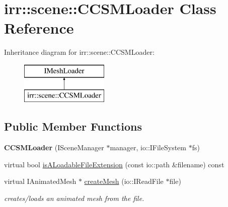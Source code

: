 \hypertarget{classirr_1_1scene_1_1_c_c_s_m_loader}{\section{irr\-:\-:scene\-:\-:C\-C\-S\-M\-Loader Class Reference}
\label{classirr_1_1scene_1_1_c_c_s_m_loader}
}
Inheritance diagram for irr\-:\-:scene\-:\-:C\-C\-S\-M\-Loader\-:\begin{figure}[H]
\begin{center}
\leavevmode
\includegraphics[height=2.000000cm]{classirr_1_1scene_1_1_c_c_s_m_loader}
\end{center}
\end{figure}
\subsection*{Public Member Functions}
\begin{DoxyCompactItemize}
\item 
\hypertarget{classirr_1_1scene_1_1_c_c_s_m_loader_a2a81fbd7c99a2c6f3edd713761928688}{{\bfseries C\-C\-S\-M\-Loader} (I\-Scene\-Manager $\ast$manager, io\-::\-I\-File\-System $\ast$fs)}\label{classirr_1_1scene_1_1_c_c_s_m_loader_a2a81fbd7c99a2c6f3edd713761928688}

\item 
virtual bool \hyperlink{classirr_1_1scene_1_1_c_c_s_m_loader_ad023927857b5a79a84b98225094b4f82}{is\-A\-Loadable\-File\-Extension} (const io\-::path \&filename) const 
\item 
\hypertarget{classirr_1_1scene_1_1_c_c_s_m_loader_a9291aa3c7849468692b2cfbfee77a8b0}{virtual I\-Animated\-Mesh $\ast$ \hyperlink{classirr_1_1scene_1_1_c_c_s_m_loader_a9291aa3c7849468692b2cfbfee77a8b0}{create\-Mesh} (io\-::\-I\-Read\-File $\ast$file)}\label{classirr_1_1scene_1_1_c_c_s_m_loader_a9291aa3c7849468692b2cfbfee77a8b0}

\begin{DoxyCompactList}\small\item\em creates/loads an animated mesh from the file. \end{DoxyCompactList}\end{DoxyCompactItemize}


